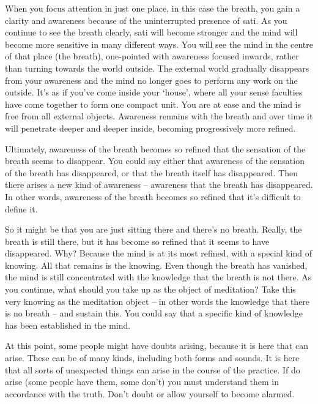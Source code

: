 When you focus attention in just one place, in this case the breath, you gain a clarity and awareness because of the uninterrupted presence of sati. As you continue to see the breath clearly, sati will become stronger and the mind will become more sensitive in many different ways. You will see the mind in the centre of that place (the breath), one-pointed with awareness focused inwards, rather than turning towards the world outside. The external world gradually disappears from your awareness and the mind no longer goes to perform any work on the outside. It's as if you've come inside your `house', where all your sense faculties have come together to form one compact unit. You are at ease and the mind is free from all external objects. Awareness remains with the breath and over time it will penetrate deeper and deeper inside, becoming progressively more refined.

Ultimately, awareness of the breath becomes so refined that the sensation of the breath seems to disappear. You could say either that awareness of the sensation of the breath has disappeared, or that the breath itself has disappeared. Then there arises a new kind of awareness -- awareness that the breath has disappeared. In other words, awareness of the breath becomes so refined that it's difficult to define it.

So it might be that you are just sitting there and there's no breath. Really, the breath is still there, but it has become so refined that it seems to have disappeared. Why? Because the mind is at its most refined, with a special kind of knowing. All that remains is the knowing. Even though the breath has vanished, the mind is still concentrated with the knowledge that the breath is not there. As you continue, what should you take up as the object of meditation? Take this very knowing as the meditation object -- in other words the knowledge that there is no breath -- and sustain this. You could say that a specific kind of knowledge has been established in the mind.

At this point, some people might have doubts arising, because it is here that  can arise. These can be of many kinds, including both forms and sounds. It is here that all sorts of unexpected things can arise in the course of the practice. If  do arise (some people have them, some don't) you must understand them in accordance with the truth. Don't doubt or allow yourself to become alarmed.

